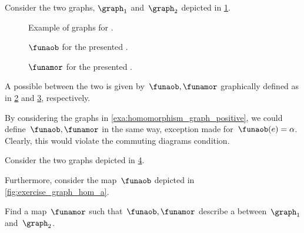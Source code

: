 {\begin{example}
    \label{exa:homomorphism_graph_positive}
    Consider the two graphs, $\graph_1$ and~$\graph_2$ depicted in \cref{fig:ex_graph_homom}.
    \begin{figure}[h]
        \centering
        \caption{Example of graphs for .}
        \label{fig:ex_graph_homom}
    \end{figure}

    \begin{figure}[h]
        \centering
        \caption{$\funaob$ for the presented .}
        \label{fig:graph_homo_a}
    \end{figure}

    \begin{figure}[h]
        \centering
        \caption{$\funamor$ for the presented .}
        \label{fig:graph_homo_b}
    \end{figure}

    A possible  between the two is given by~$\funaob,\funamor$ graphically defined as in \cref{fig:graph_homo_a} and \cref{fig:graph_homo_b}, respectively.
\end{example}

\begin{example}[Counterexample]
    By considering the graphs in \cref{exa:homomorphism_graph_positive}, we could define~$\funaob,\funamor$ in the same way, exception made for~$\funaob(e)=\alpha$.
    Clearly, this would violate the commuting diagrams condition.
\end{example}

\begin{exercise}
    Consider the two graphs depicted in \cref{fig:ex_graph_hom}.
    \begin{figure}[h]
        \centering
        \caption{}
        \label{fig:ex_graph_hom}
    \end{figure}
    \begin{marginfigure}
        \centering
        \caption{}
        \label{fig:exercise_graph_hom_a}
    \end{marginfigure}
    Furthermore, consider the map~$\funaob$ depicted in \cref{fig:exercise_graph_hom_a}.

    Find a map~$\funamor$ such that~$\funaob,\funamor$ describe a  between~$\graph_1$ and~$\graph_2$.
\end{exercise}

}

